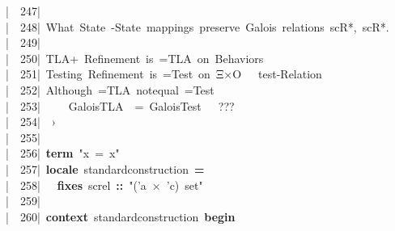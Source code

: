 \documentclass{article}
\newcommand{\syntaxCOMMENTC}[1]{\textcolor[rgb]{0.4,0.0,0.8}{#1}}
\newcommand{\syntaxKEYWORDA}[1]{\textcolor[rgb]{0.0,0.4,0.6}{\textbf{#1}}}
\newcommand{\syntaxKEYWORDB}[1]{\textcolor[rgb]{0.0,0.6,0.4}{\textbf{#1}}}
\newcommand{\syntaxLITERALA}[1]{\textcolor[rgb]{1.0,0.0,0.8}{#1}}
\newcommand{\syntaxOPERATOR}[1]{\textcolor[rgb]{0.0,0.0,0.0}{\textbf{#1}}}
\newcommand{\syntaxCOMMENTC}[1]{\textcolor[rgb]{0.4,0.0,0.8}{#1}}
\newcommand{\syntaxKEYWORDA}[1]{\textcolor[rgb]{0.0,0.4,0.6}{\textbf{#1}}}
\newcommand{\syntaxKEYWORDB}[1]{\textcolor[rgb]{0.0,0.6,0.4}{\textbf{#1}}}
\newcommand{\syntaxLITERALA}[1]{\textcolor[rgb]{1.0,0.0,0.8}{#1}}
\newcommand{\syntaxOPERATOR}[1]{\textcolor[rgb]{0.0,0.0,0.0}{\textbf{#1}}}
\newcommand{\syntaxCOMMENTC}[1]{\textcolor[rgb]{0.4,0.0,0.8}{#1}}
\newcommand{\syntaxKEYWORDA}[1]{\textcolor[rgb]{0.0,0.4,0.6}{\textbf{#1}}}
\newcommand{\syntaxKEYWORDB}[1]{\textcolor[rgb]{0.0,0.6,0.4}{\textbf{#1}}}
\newcommand{\syntaxLITERALA}[1]{\textcolor[rgb]{1.0,0.0,0.8}{#1}}
\newcommand{\syntaxOPERATOR}[1]{\textcolor[rgb]{0.0,0.0,0.0}{\textbf{#1}}}
\newcommand{\syntaxCOMMENTC}[1]{\textcolor[rgb]{0.4,0.0,0.8}{\textbf{#1}}}
\newcommand{\syntaxKEYWORDA}[1]{\textcolor[rgb]{0.0,0.4,0.6}{#1}}
\newcommand{\syntaxKEYWORDB}[1]{\textcolor[rgb]{0.0,0.6,0.4}{#1}}
\newcommand{\syntaxLITERALA}[1]{\textcolor[rgb]{1.0,0.0,0.8}{\textbf{#1}}}
\newcommand{\syntaxOPERATOR}[1]{\textcolor[rgb]{0.0,0.0,0.0}{#1}}
\newcommand{\syntaxCOMMENTC}[1]{\textcolor[rgb]{0.4,0.0,0.8}{#1}}
\newcommand{\syntaxKEYWORDA}[1]{\textcolor[rgb]{0.0,0.4,0.6}{\textbf{#1}}}
\newcommand{\syntaxKEYWORDB}[1]{\textcolor[rgb]{0.0,0.6,0.4}{\textbf{#1}}}
\newcommand{\syntaxLITERALA}[1]{\textcolor[rgb]{1.0,0.0,0.8}{#1}}
\newcommand{\syntaxOPERATOR}[1]{\textcolor[rgb]{0.0,0.0,0.0}{\textbf{#1}}}
\newcommand{\syntaxCOMMENTC}[1]{\textcolor[rgb]{0.4,0.0,0.8}{#1}}
\newcommand{\syntaxKEYWORDA}[1]{\textcolor[rgb]{0.0,0.4,0.6}{\textbf{#1}}}
\newcommand{\syntaxKEYWORDB}[1]{\textcolor[rgb]{0.0,0.6,0.4}{\textbf{#1}}}
\newcommand{\syntaxLITERALA}[1]{\textcolor[rgb]{1.0,0.0,0.8}{#1}}
\newcommand{\syntaxOPERATOR}[1]{\textcolor[rgb]{0.0,0.0,0.0}{\textbf{#1}}}
\newcommand{\syntaxCOMMENTC}[1]{\textcolor[rgb]{0.0,0.0,0.0}{#1}}
\newcommand{\syntaxKEYWORDA}[1]{\textcolor[rgb]{0.0,0.0,0.0}{#1}}
\newcommand{\syntaxKEYWORDB}[1]{\textcolor[rgb]{0.0,0.0,0.0}{#1}}
\newcommand{\gutter}[1]{\textcolor[rgb]{0,0,0}{{|}#1}}
\newcommand{\gutterH}[1]{\textcolor[rgb]{1,0,0}{{|}#1}}
\begin{document}
\gutter{\ \ 247{|}\ }\hspace*{\fill}\\
\gutter{\ \ 248{|}\ }\syntaxCOMMENTC{What{\ }State{\ }{-}\usebox{\greaterthan}{\ }State{\ }mappings{\ }preserve{\ }Galois{\ }relations{\ }\usebox{\lessthan}sc\usebox{\underscorebox}R*,{\ }sc\usebox{\underscorebox}R\usebox{\underscorebox}*\usebox{\greaterthan}.}\hspace*{\fill}\\
\gutter{\ \ 249{|}\ }\hspace*{\fill}\\
\gutterH{\ \ 250{|}\ }\syntaxCOMMENTC{TLA+{\ }Refinement{\ }is{\ }=\usebox{\greaterthan}TLA{\ }on{\ }Behaviors}\hspace*{\fill}\\
\gutter{\ \ 251{|}\ }\syntaxCOMMENTC{Testing{\ }Refinement{\ }is{\ }=\usebox{\greaterthan}Test{\ }on{\ }Ξ×O{\ }{\ }{\ }test{-}Relation}\hspace*{\fill}\\
\gutter{\ \ 252{|}\ }\syntaxCOMMENTC{Although{\ }=\usebox{\greaterthan}TLA{\ }notequal{\ }=\usebox{\greaterthan}Test}\hspace*{\fill}\\
\gutter{\ \ 253{|}\ }\syntaxCOMMENTC{{\ }{\ }{\ }{\ }Galois\usebox{\underscorebox}TLA{\ }{\ }={\ }Galois\usebox{\underscorebox}Test{\ }{\ }{\ }???}\hspace*{\fill}\\
\gutter{\ \ 254{|}\ }\syntaxCOMMENTC{{\ }}\syntaxCOMMENTC{›}\hspace*{\fill}\\
\gutterH{\ \ 255{|}\ }{\ }\hspace*{\fill}\\
\gutter{\ \ 256{|}\ }\syntaxKEYWORDA{term}{\ }\syntaxLITERALA{"x{\ }={\ }x"}\hspace*{\fill}\\
\gutter{\ \ 257{|}\ }\syntaxKEYWORDA{locale}{\ }standard\usebox{\underscorebox}construction{\ }\syntaxOPERATOR{=}\hspace*{\fill}\\
\gutter{\ \ 258{|}\ }{\ }{\ }\syntaxKEYWORDB{fixes}{\ }sc\usebox{\underscorebox}rel{\ }\syntaxOPERATOR{::}{\ }\syntaxLITERALA{"('a{\ }×{\ }'c){\ }set"}{\ }\hspace*{\fill}\\
\gutter{\ \ 259{|}\ }\hspace*{\fill}\\
\gutterH{\ \ 260{|}\ }\syntaxKEYWORDA{context}{\ }standard\usebox{\underscorebox}construction{\ }\syntaxKEYWORDB{begin}\hspace*{\fill}\\
\end{document}
